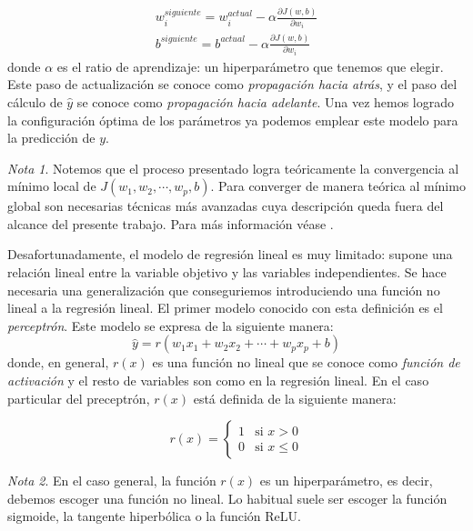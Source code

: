 \documentclass[12pt, a4paper, twoside]{book}
\numberwithin{equation}{section}
\theoremstyle{definition}
\theoremstyle{remark}
\newtheorem*{remark}{Nota}
\theoremstyle{plain}
\begin{document}
	\begin{equation*}
	\begin{array}{c}
		w_{i}^{siguiente}=w_{i}^{actual}-\alpha\frac{\partial J(w,b)}
		{\partial w_{i}}\\
		b^{siguiente}=b^{actual}-\alpha\frac{\partial J(w,b)}
		{\partial w_{i}}
	\end{array}
	\end{equation*}
	donde $\alpha$ es el ratio de aprendizaje: un hiperparámetro que 
	tenemos que elegir. Este paso de actualización se conoce como 
	\emph{propagación hacia atrás}, y el paso del cálculo de $\hat{y}$ se 
	conoce como \emph{propagación hacia adelante}. Una vez hemos logrado 
	la 
	configuración óptima de los parámetros ya podemos emplear este modelo 
	para la predicción de $y$.
	
	\begin{remark}
	Notemos que el proceso presentado logra teóricamente la convergencia 
	al mínimo local de $J(w_{1},w_{2},\cdots,w_{p},b)$. Para converger de 
	manera teórica al 
	mínimo global son necesarias técnicas más avanzadas cuya descripción 
	queda fuera del alcance del presente trabajo. Para más información 
	véase \cite{Goodfellow-et-al-2016}.
	\end{remark}

	Desafortunadamente, el modelo de regresión lineal es muy limitado: 
	supone una relación lineal entre la variable objetivo y las variables
	independientes. Se hace necesaria una generalización que conseguriemos
	introduciendo una función no lineal a la regresión lineal. El primer
	modelo conocido con esta definición es el \emph{perceptrón}. Este 
	modelo se expresa de la siguiente manera:
	\begin{equation*}
		\hat{y}=r(w_{1}x_{1}+w_{2}x_{2}+\cdots+w_{p}x_{p}+b)
	\end{equation*}
	donde, en general, $r(x)$ es una función no lineal que se conoce como 
	\emph{función de activación} y el resto de variables son como en la 
	regresión lineal. En el caso particular del preceptrón, $r(x)$ está 
	definida de la siguiente manera:
	
	\begin{equation}
		\label{def:r}
		r(x)=\left \{
			\begin{array}{ll}
				1&\text{si }x>0\\
				0&\text{si }x\leq0
			\end{array} 
		     \right .
	\end{equation}

	\begin{remark}
	En el caso general, la función $r(x)$ es un hiperparámetro, es decir,
	debemos escoger una función no lineal. Lo habitual suele ser escoger
	la función sigmoide, la tangente hiperbólica o la función ReLU.
	\end{remark}
	
\end{document}
